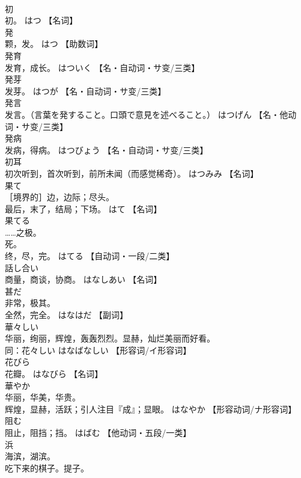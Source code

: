 \documentclass[8pt]{extreport}
\begin{document}
\begin{CJK}{UTF8}{min}
\\	初	
\\	初。	はつ		【名词】
\\	発	
\\	颗，发。	はつ		【助数词】
\\	発育	
\\	发育，成长。	はついく		【名・自动词・サ变/三类】
\\	発芽	
\\	发芽。	はつが		【名・自动词・サ变/三类】
\\	発言	
\\	发言。（言葉を発すること。口頭で意見を述べること。）	はつげん		【名・他动词・サ变/三类】
\\	発病	
\\	发病，得病。	はつびょう		【名・自动词・サ变/三类】
\\	初耳	
\\	初次听到，首次听到，前所未闻（而感觉稀奇）。	はつみみ		【名词】
\\	果て	
\\	［境界的］边，边际；尽头。 
\\	最后，末了，结局；下场。	はて		【名词】
\\	果てる	
\\	……之极。 
\\	死。 
\\	终，尽，完。	はてる		【自动词・一段/二类】
\\	話し合い	
\\	商量，商谈，协商。	はなしあい		【名词】
\\	甚だ	
\\	非常，极其。 
\\	全然，完全。	はなはだ		【副词】
\\	華々しい	
\\	华丽，绚丽，辉煌，轰轰烈烈。显赫，灿烂美丽而好看。 
\\	同：花々しい	はなばなしい		【形容词/イ形容词】
\\	花びら	
\\	花瓣。	はなびら		【名词】
\\	華やか	
\\	华丽，华美，华贵。 
\\	辉煌，显赫，活跃；引人注目『成』；显眼。	はなやか		【形容动词/ナ形容词】
\\	阻む	
\\	阻止，阻挡；挡。	はばむ		【他动词・五段/一类】
\\	浜	
\\	海滨，湖滨。 
\\	吃下来的棋子。提子。 

\end{CJK}
\end{document}
